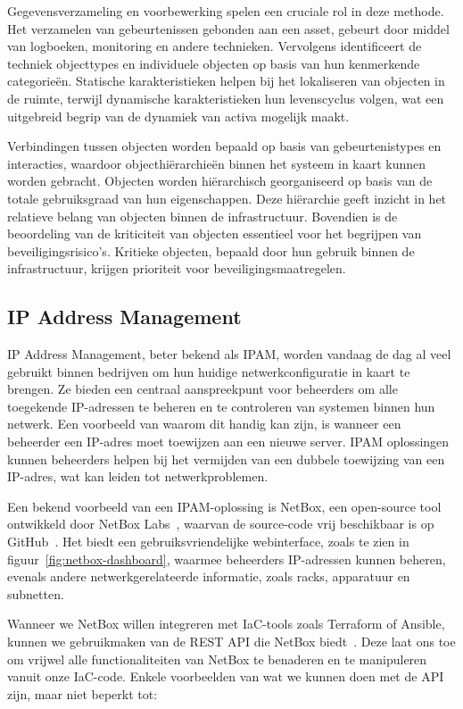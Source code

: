 Gegevensverzameling en voorbewerking spelen een cruciale rol in deze methode.
Het verzamelen van gebeurtenissen gebonden aan een asset, gebeurt door middel van logboeken, monitoring en andere technieken.
Vervolgens identificeert de techniek objecttypes en individuele objecten op basis van hun kenmerkende categorie\"en.
Statische karakteristieken helpen bij het lokaliseren van objecten in de ruimte, terwijl dynamische karakteristieken hun levenscyclus volgen, wat een uitgebreid begrip van de dynamiek van activa mogelijk maakt.

Verbindingen tussen objecten worden bepaald op basis van gebeurtenistypes en interacties, waardoor objecthi\"erarchie\"en binnen het systeem in kaart kunnen worden gebracht.
Objecten worden hi\"erarchisch georganiseerd op basis van de totale gebruiksgraad van hun eigenschappen.
Deze hi\"erarchie geeft inzicht in het relatieve belang van objecten binnen de infrastructuur.
Bovendien is de beoordeling van de kriticiteit van objecten essentieel voor het begrijpen van beveiligingsrisico's.
Kritieke objecten, bepaald door hun gebruik binnen de infrastructuur, krijgen prioriteit voor beveiligingsmaatregelen.

\subsection{IP Address Management}
\label{sub:ipam}

IP Address Management, beter bekend als IPAM, worden vandaag de dag al veel gebruikt binnen bedrijven om hun huidige netwerkconfiguratie in kaart te brengen.
Ze bieden een centraal aanspreekpunt voor beheerders om alle toegekende IP-adressen te beheren en te controleren van systemen binnen hun netwerk.
Een voorbeeld van waarom dit handig kan zijn, is wanneer een beheerder een IP-adres moet toewijzen aan een nieuwe server.
IPAM oplossingen kunnen beheerders helpen bij het vermijden van een dubbele toewijzing van een IP-adres, wat kan leiden tot netwerkproblemen.

Een bekend voorbeeld van een IPAM-oplossing is NetBox, een open-source tool ontwikkeld door NetBox Labs~\autocite{netbox-ipam}, waarvan de source-code vrij beschikbaar is op GitHub~\autocite{netbox-github}.
Het biedt een gebruiksvriendelijke webinterface, zoals te zien in figuur~\ref{fig:netbox-dashboard}, waarmee beheerders IP-adressen kunnen beheren, evenals andere netwerkgerelateerde informatie, zoals racks, apparatuur en subnetten.

Wanneer we NetBox willen integreren met IaC-tools zoals Terraform of Ansible, kunnen we gebruikmaken van de REST API die NetBox biedt~\autocite{netbox-api}.
Deze laat ons toe om vrijwel alle functionaliteiten van NetBox te benaderen en te manipuleren vanuit onze IaC-code.
Enkele voorbeelden van wat we kunnen doen met de API zijn, maar niet beperkt tot:


